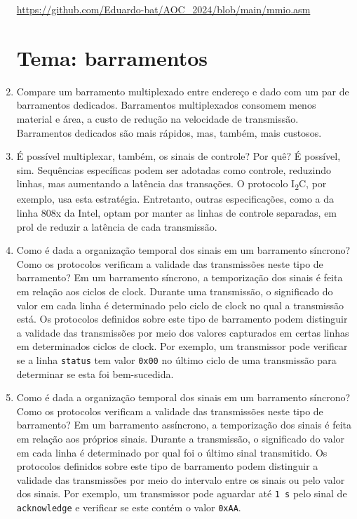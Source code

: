 \documentclass{article}
\begin{document}
\begin{enumerate}
\url{https://github.com/Eduardo-bat/AOC_2024/blob/main/mmio.asm}

\section*{Tema: barramentos}

\item Compare um barramento multiplexado entre endereço e dado com um par de barramentos dedicados. Barramentos multiplexados consomem menos material e área, a custo de redução na velocidade de transmissão. Barramentos dedicados são mais rápidos, mas, também, mais custosos.

\item É possível multiplexar, também, os sinais de controle? Por quê? É possível, sim. Sequências específicas podem ser adotadas como controle, reduzindo linhas, mas aumentando a latência das transações. O protocolo I\textsubscript{2}C, por exemplo, usa esta estratégia. Entretanto, outras especificações, como a da linha 808x da Intel, optam por manter as linhas de controle separadas, em prol de reduzir a latência de cada transmissão.

\item Como é dada a organização temporal dos sinais em um barramento síncrono? Como os protocolos verificam a validade das transmissões neste tipo de barramento? Em um barramento síncrono, a temporização dos sinais é feita em relação aos ciclos de clock. Durante uma transmissão, o significado do valor em cada linha é determinado pelo ciclo de clock no qual a transmissão está. Os protocolos definidos sobre este tipo de barramento podem distinguir a validade das transmissões por meio dos valores capturados em certas linhas em determinados ciclos de clock. Por exemplo, um transmissor pode verificar se a linha \texttt{status} tem valor \texttt{0x00} no último ciclo de uma transmissão para determinar se esta foi bem-sucedida.

\item Como é dada a organização temporal dos sinais em um barramento síncrono? Como os protocolos verificam a validade das transmissões neste tipo de barramento? Em um barramento assíncrono, a temporização dos sinais é feita em relação aos próprios sinais. Durante a transmissão, o significado do valor em cada linha é determinado por qual foi o último sinal transmitido. Os protocolos definidos sobre este tipo de barramento podem distinguir a validade das transmissões por meio do intervalo entre os sinais ou pelo valor dos sinais. Por exemplo, um transmissor pode aguardar até \texttt{1 s} pelo sinal de \texttt{acknowledge} e verificar se este contém o valor \texttt{0xAA}.


\end{enumerate}
\end{document}
